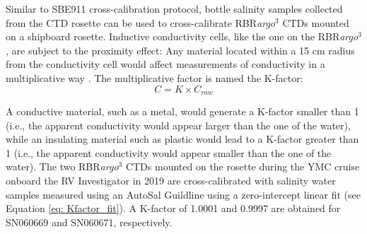 \documentclass{ametsocV6.1}
\begin{document}
\appendix[B]
\label{app: Kfactor}

Similar to SBE911 cross-calibration protocol, bottle salinity samples collected from the CTD rosette can be used to cross-calibrate RBR\textit{argo}$^3$ CTDs mounted on a shipboard rosette. Inductive conductivity cells, like the one on the RBR\textit{argo}$^3$, are subject to the proximity effect: Any material located within a 15 cm radius from the conductivity cell would affect measurements of conductivity in a multiplicative way \citep{Halverson_2020}. The multiplicative factor is named the K-factor:
\begin{equation}
	C = K \times C_{raw}
	\label{eq: Kfactor_fit}
\end{equation}

 A conductive material, such as a metal, would generate a K-factor smaller than 1 (i.e., the apparent conductivity would appear larger than the one of the water), while an insulating material such as plastic would lead to a K-factor greater than 1 (i.e., the apparent conductivity would appear smaller than the one of the water). The two RBR\textit{argo}$^3$ CTDs mounted on the rosette during the YMC cruise onboard the RV Investigator in 2019 \citep[serial numbers 060669 and 060671;][]{YMCreport_2019} are cross-calibrated with salinity water samples measured using an AutoSal Guildline using a zero-intercept linear fit (see Equation \ref{eq: Kfactor_fit}). A K-factor of 1.0001 and 0.9997 are obtained for SN060669 and SN060671, respectively.



\end{document}
